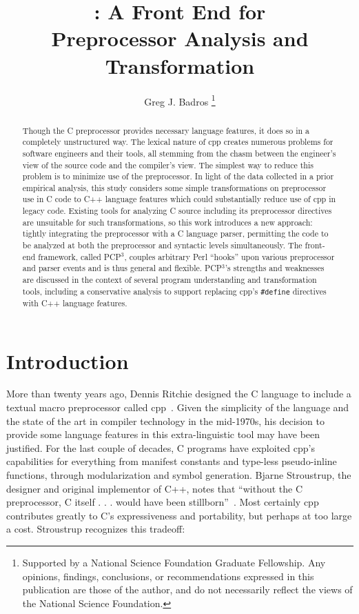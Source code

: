 \documentclass{article}
\title{\pcp{}: A \C{} Front End for \\ Preprocessor Analysis and Transformation}
\author{Greg J. Badros%
  \thanks{Supported by a National Science Foundation
    Graduate Fellowship. Any opinions, findings, conclusions, or
    recommendations expressed in this publication are those of the
    author, and do not necessarily reflect the views of the National
    Science Foundation.}
  }
\newcommand{\pcp}{\mbox{\textsf{PCP}$^3$}}
\newcommand{\Cpp}{\mbox{\textsf{cpp}}}
\newcommand{\CPP}{\mbox{\textsf{C++}}}
\newcommand{\Perl}{\mbox{\textsf{Perl}}}
\newcommand{\C}{\mbox{\textsf{C}}}
\newcommand{\ppd}[1]{\texttt{\##1}}
\begin{document}
\maketitle

\begin{abstract}
\label{sec:abstract}
  Though the \C{} preprocessor provides necessary language features, it
  does so in a completely unstructured way.  The lexical nature of
  \Cpp{} creates numerous problems for software engineers and their
  tools, all stemming from the chasm between the engineer's view of the
  source code and the compiler's view.  The simplest way to reduce this
  problem is to minimize use of the preprocessor.  In light of the data
  collected in a prior empirical analysis, this study considers some
  simple transformations on preprocessor use in \C{} code to \CPP{}
  language features which could substantially reduce use of \Cpp{} in
  legacy code. Existing tools for analyzing \C{} source including its
  preprocessor directives are unsuitable for such transformations, so
  this work introduces a new approach: tightly integrating the
  preprocessor with a \C{} language parser, permitting the code to be
  analyzed at both the preprocessor and syntactic levels simultaneously.
  The front-end framework, called \pcp{}, couples arbitrary \Perl{}
  ``hooks'' upon various preprocessor and parser events and is thus
  general and flexible. \pcp{}'s strengths and weaknesses are discussed
  in the context of several program understanding and transformation
  tools, including a conservative analysis to support replacing \Cpp{}'s
  \ppd{define} directives with \CPP{} language features.

\end{abstract}
\bigskip

\section{Introduction}
\label{sec:intro}
More than twenty years ago, Dennis Ritchie designed the \C{} language to
include a textual macro preprocessor called
\Cpp{}~\cite[Ch.~3]{Harbison91}.  Given the simplicity of the language
and the state of the art in compiler technology in the mid-1970s, his
decision to provide some language features in this extra-linguistic tool
may have been justified.  For the last couple of decades, \C{} programs
have exploited \Cpp{}'s capabilities for everything from manifest
constants and type-less pseudo-inline functions, through modularization
and symbol generation.  Bjarne Stroustrup, the designer and original
implementor of \CPP{}, notes that ``without the \C{} preprocessor, \C{}
itself . . . would have been stillborn''~\cite[p.~119]{Stroustrup94}.
Most certainly \Cpp{} contributes greatly to \C{}'s expressiveness and
portability, but perhaps at too large a cost.  Stroustrup recognizes
this tradeoff:
\end{document}
